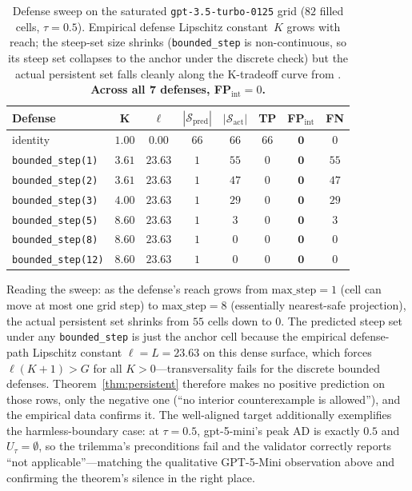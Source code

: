 \documentclass[11pt]{article}
\begin{document}
\begin{table}[h]
\centering
\small
\caption{Defense sweep on the saturated
\texttt{gpt-3.5-turbo-0125} grid ($82$ filled cells, $\tau = 0.5$).
Empirical defense Lipschitz constant~$K$ grows with reach;
the steep-set size shrinks (\texttt{bounded\_step} is
non-continuous, so its steep set collapses to the anchor under
the discrete check) but the actual persistent set falls cleanly
along the K-tradeoff curve from .
\textbf{Across all 7 defenses, FP$_{\text{int}} = 0$.}}
\label{tab:live-sweep}
\begin{tabular}{lccccccc}
\toprule
\textbf{Defense} & $\boldsymbol{K}$ & $\boldsymbol{\ell}$ & $|\mathcal{S}_{\text{pred}}|$ & $|\mathcal{S}_{\text{act}}|$ & \textbf{TP} & \textbf{FP}$_{\text{int}}$ & \textbf{FN} \\
\midrule
identity                           & $1.00$ & $0.00$  & $66$ & $66$ & $66$ & $\mathbf{0}$ & $0$ \\
\texttt{bounded\_step(1)}          & $3.61$ & $23.63$ & $1$  & $55$ & $0$  & $\mathbf{0}$ & $55$ \\
\texttt{bounded\_step(2)}          & $3.61$ & $23.63$ & $1$  & $47$ & $0$  & $\mathbf{0}$ & $47$ \\
\texttt{bounded\_step(3)}          & $4.00$ & $23.63$ & $1$  & $29$ & $0$  & $\mathbf{0}$ & $29$ \\
\texttt{bounded\_step(5)}          & $8.60$ & $23.63$ & $1$  & $3$  & $0$  & $\mathbf{0}$ & $3$  \\
\texttt{bounded\_step(8)}          & $8.60$ & $23.63$ & $1$  & $0$  & $0$  & $\mathbf{0}$ & $0$  \\
\texttt{bounded\_step(12)}         & $8.60$ & $23.63$ & $1$  & $0$  & $0$  & $\mathbf{0}$ & $0$  \\
\bottomrule
\end{tabular}
\end{table}

Reading the sweep: as the defense's reach grows from
$\text{max\_step}=1$ (cell can move at most one grid step) to
$\text{max\_step}=8$ (essentially nearest-safe projection), the
actual persistent set shrinks from $55$ cells down to $0$. The
predicted steep set under any \texttt{bounded\_step} is just the
anchor cell because the empirical defense-path Lipschitz
constant $\ell = L = 23.63$ on this dense surface, which forces
$\ell(K{+}1) > G$ for all $K > 0$---transversality fails for the
discrete bounded defenses. Theorem~\ref{thm:persistent} therefore
makes no positive prediction on those rows, only the negative one
(``no interior counterexample is allowed''), and the empirical
data confirms it. The well-aligned target additionally exemplifies
the harmless-boundary case: at $\tau = 0.5$, gpt-5-mini's peak AD
is exactly $0.5$ and $U_\tau = \emptyset$, so the trilemma's
preconditions fail and the validator correctly reports
``not applicable''---matching the qualitative GPT-5-Mini
observation above and confirming the theorem's silence in the
right place.
\end{document}
